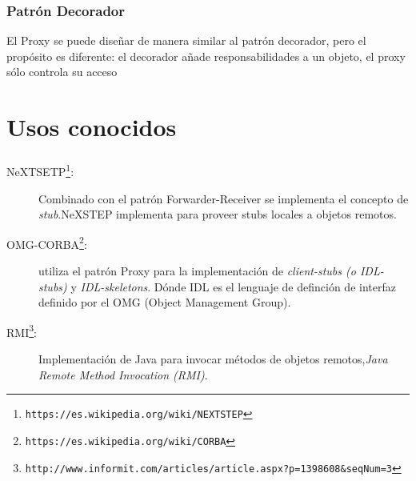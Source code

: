 \documentclass{beamer}
\begin{document}
\begin{frame}{\insertsection{}}
  \frametitle{Patrón Decorador}
  El Proxy se puede diseñar de manera similar al patrón decorador,
  pero el propósito es diferente: el decorador añade responsabilidades
  a un objeto, el proxy sólo controla su acceso
\end{frame}  


\section{Usos conocidos}

\begin{frame}{\insertsection{}}
  \frametitle{\insertsection{}}
  \begin{description}
  \item[NeXTSETP\footnote{\texttt{https://es.wikipedia.org/wiki/NEXTSTEP}}:]
    Combinado con el patrón Forwarder-Receiver se implementa el
    concepto de \emph{stub}.NeXSTEP implementa para proveer stubs
    locales a objetos remotos.

  \item[OMG-CORBA\footnote{\texttt{https://es.wikipedia.org/wiki/CORBA}}:]
    utiliza el patrón Proxy para la implementación de
    \emph{client-stubs (o IDL-stubs)}  y \emph{IDL-skeletons}. Dónde
    IDL es el lenguaje de definción de interfaz definido por el OMG
    (Object Management Group).

\item[RMI\footnote{\texttt{http://www.informit.com/articles/article.aspx?p=1398608\&seqNum=3}}:] Implementación de Java para invocar métodos de objetos
  remotos,\emph{Java Remote Method Invocation (RMI)}.
  \end{description}
\end{frame}  
\end{document}
